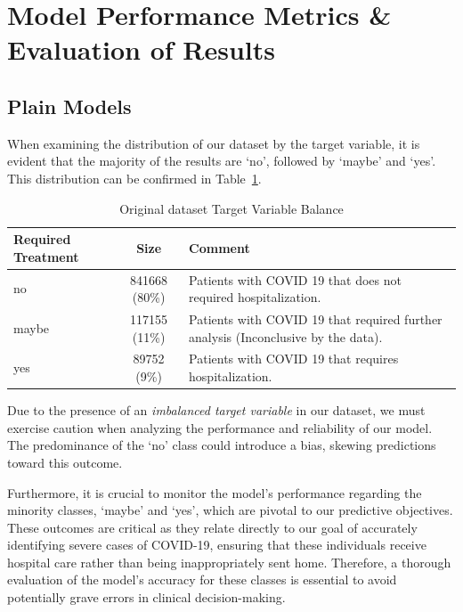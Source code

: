 \section{Model Performance Metrics \& Evaluation of Results}

\subsection{Plain Models}

When examining the distribution of our dataset by the target variable, it is evident that the majority of the results are `no', followed by `maybe' and `yes'. This distribution can be confirmed in Table~\ref{tab:dataset_target_variable}.

\begin{table}[H]
    \centering
    \caption{Original dataset Target Variable Balance}
    \label{tab:dataset_target_variable}
    \begin{tabular}{p{2.5cm}cp{8.5cm}} \hline
     \textbf{Required Treatment} & \textbf{Size} & \textbf{Comment}
     \\ \hline\hline
      no & 841668 (80\%) & Patients with COVID 19 that does not
      required hospitalization. \\ 
      maybe & 117155 (11\%) & Patients with COVID 19 that required
      further analysis (Inconclusive by the data). \\ 
      yes & 89752 (9\%) & Patients with COVID 19 that requires 
      hospitalization.\\ \hline
    \end{tabular}
\end{table}

Due to the presence of an \emph{imbalanced target variable} in our
dataset, we must exercise caution when analyzing the performance 
and reliability of our model. The predominance of the `no' class
could introduce a bias, skewing predictions toward this outcome.

Furthermore, it is crucial to monitor the model's performance 
regarding the minority classes, `maybe' and `yes', which are pivotal
to our predictive objectives. These outcomes are critical as they
relate directly to our goal of accurately identifying severe cases
of COVID-19, ensuring that these individuals receive hospital care
rather than being inappropriately sent home. Therefore, a thorough 
evaluation of the model's accuracy for these classes is essential
to avoid potentially grave errors in clinical decision-making.

